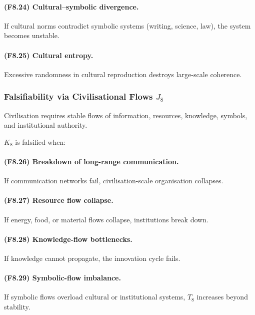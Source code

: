 \paragraph{(F8.24) Cultural–symbolic divergence.}
If cultural norms contradict symbolic systems (writing, science, law),
the system becomes unstable.

\paragraph{(F8.25) Cultural entropy.}
Excessive randomness in cultural reproduction
destroys large-scale coherence.



\subsubsection{Falsifiability via Civilisational Flows \texorpdfstring{$J_8$}{J_8}}

Civilisation requires stable flows of information, resources,
knowledge, symbols, and institutional authority.

$K_8$ is falsified when:

\paragraph{(F8.26) Breakdown of long-range communication.}
If communication networks fail,
civilisation-scale organisation collapses.

\paragraph{(F8.27) Resource flow collapse.}
If energy, food, or material flows collapse,
institutions break down.

\paragraph{(F8.28) Knowledge-flow bottlenecks.}
If knowledge cannot propagate,
the innovation cycle fails.

\paragraph{(F8.29) Symbolic-flow imbalance.}
If symbolic flows overload cultural or institutional systems,
$T_8$ increases beyond stability.

